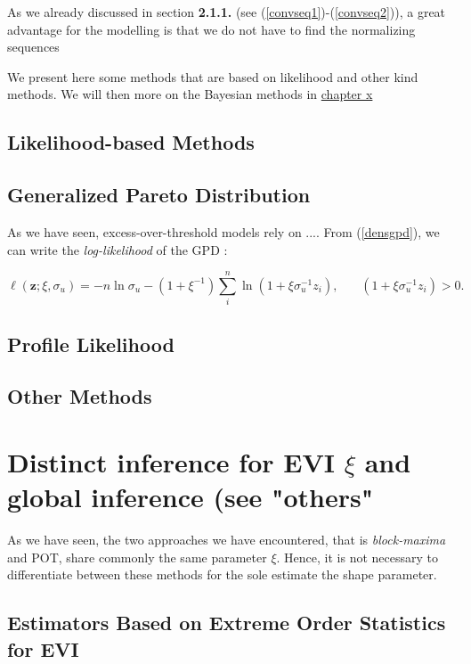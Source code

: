 As we already discussed in section \textbf{2.1.1.} (see (\ref{convseq1})-(\ref{convseq2})), a great advantage for the modelling is that we do not have to find the normalizing sequences
\fi

We present here some methods that are based on likelihood and other kind methods. We will then more on the Bayesian methods in \hyperref[sec:bayesian]{chapter x }
\subsection{Likelihood-based Methods}\label{likintro_pot}



\subsection*{Generalized Pareto Distribution}

As we have seen, excess-over-threshold models rely on ....
From (\ref{densgpd}), we can write the \emph{log-likelihood }of the GPD : 

\begin{equation}\label{likk}
\ell(\textbf{z};\xi,\sigma_u) = -n\ln\sigma_u-(1+\xi^{-1})\sum_{i}^n\ln(1+\xi \sigma_u^{-1}z_i), \ \ \ \ \ \ \ \ (1+\xi \sigma_u^{-1}z_i)>0.
\end{equation}



\subsection{Profile Likelihood}

\subsection{Other Methods}

\section*{Distinct inference for EVI $\xi$ and global inference (see "others"}
\citet[pp.140]{beirlant_statistics_2006}


As we have seen, the two approaches we have encountered, that is \emph{block-maxima} and POT, share commonly the same parameter $\xi$. Hence, it is not necessary to differentiate between these methods for the sole estimate the shape parameter. 

\subsection{Estimators Based on Extreme Order Statistics for EVI}\label{sec:infevi}

